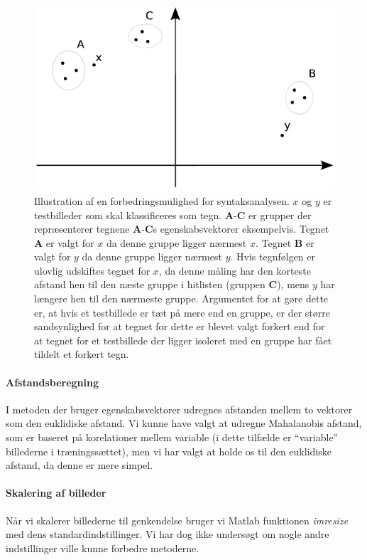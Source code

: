 \begin{figure}[htp]
\centering
\includegraphics{implementation/illu/syntaks_forbedring.pdf}
\caption{Illustration af en forbedringsmulighed for syntaksanalysen. $x$ og $y$ er testbilleder som skal klassificeres som tegn. \textbf{A}-\textbf{C} er grupper der repræsenterer tegnene \textbf{A}-\textbf{C}s egenskabsvektorer eksempelvis. Tegnet \textbf{A} er valgt for $x$ da denne gruppe ligger nærmest $x$. Tegnet \textbf{B} er valgt for $y$ da denne gruppe ligger nærmest $y$. Hvis tegnfølgen er ulovlig udskiftes tegnet for $x$, da denne måling har den korteste afstand hen til den næste gruppe i hitlisten (gruppen \textbf{C}), mens $y$ har længere hen til den nærmeste gruppe. Argumentet for at gøre dette er, at hvis et testbillede er tæt på mere end en gruppe, er der større sandsynlighed for at tegnet for dette er blevet valgt forkert end for at tegnet for et testbillede der ligger isoleret med en gruppe har fået tildelt et forkert tegn.}
\label{fig:syntaks_forbedring}
\end{figure}

\paragraph{Afstandsberegning}
I metoden der bruger egenskabsvektorer udregnes afstanden mellem to vektorer som den euklidiske afstand. Vi kunne have valgt at udregne Mahalanobis afstand, som er baseret på korelationer mellem variable (i dette tilfælde er ``variable'' billederne i træningssættet), men vi har valgt at holde os til den euklidiske afstand, da denne er mere simpel.

\paragraph{Skalering af billeder}
Når vi skalerer billederne til genkendelse bruger vi Matlab funktionen \textit{imresize} med dens standardindstillinger. Vi har dog ikke undersøgt om nogle andre indstillinger ville kunne forbedre metoderne.